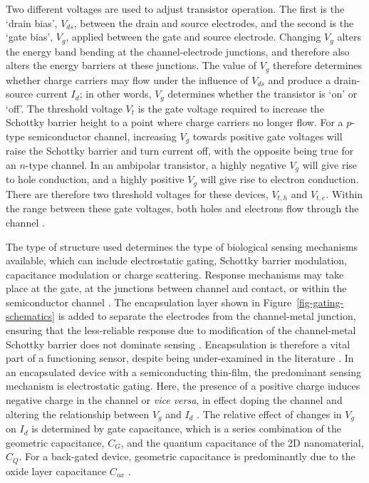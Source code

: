 \documentclass[
  a4paper,
]{scrbook}
\begin{document}
Two different voltages are used to adjust transistor operation. The
first is the `drain bias', \(V_{ds}\), between the drain and source
electrodes, and the second is the `gate bias', \(V_g\), applied between
the gate and source electrode. Changing \(V_g\) alters the energy band
bending at the channel-electrode junctions, and therefore also alters
the energy barriers at these junctions. The value of \(V_g\) therefore
determines whether charge carriers may flow under the influence of
\(V_{ds}\) and produce a drain-source current \(I_d\); in other words,
\(V_g\) determines whether the transistor is `on' or `off'. The
threshold voltage \(V_t\) is the gate voltage required to increase the
Schottky barrier height to a point where charge carriers no longer flow.
For a \(p\)-type semiconductor channel, increasing \(V_g\) towards
positive gate voltages will raise the Schottky barrier and turn current
off, with the opposite being true for an \(n\)-type channel. In an
ambipolar transistor, a highly negative \(V_g\) will give rise to hole
conduction, and a highly positive \(V_g\) will give rise to electron
conduction. There are therefore two threshold voltages for these
devices, \(V_{t,h}\) and \(V_{t,e}\). Within the range between these
gate voltages, both holes and electrons flow through the channel
\autocite{Avouris2007,Reiner-Rozman2015,Yao2021,Li2023}.

The type of structure used determines the type of biological sensing
mechanisms available, which can include electrostatic gating, Schottky
barrier modulation, capacitance modulation or charge scattering.
Response mechanisms may take place at the gate, at the junctions between
channel and contact, or within the semiconductor channel
\autocite{Heller2008,Li2023}. The encapsulation layer shown in
Figure~\ref{fig-gating-schematics} is added to separate the electrodes
from the channel-metal junction, ensuring that the less-reliable
response due to modification of the channel-metal Schottky barrier does
not dominate sensing \autocite{Heller2008,Yao2021}. Encapsulation is
therefore a vital part of a functioning sensor, despite being
under-examined in the literature \autocite{Shkodra2021}. In an
encapsulated device with a semiconducting thin-film, the predominant
sensing mechanism is electrostatic gating. Here, the presence of a
positive charge induces negative charge in the channel or \emph{vice
versa}, in effect doping the channel and altering the relationship
between \(V_g\) and \(I_d\) \autocite{Heller2008}. The relative effect
of changes in \(V_g\) on \(I_d\) is determined by gate capacitance,
which is a series combination of the geometric capacitance, \(C_{G}\),
and the quantum capacitance of the 2D nanomaterial, \(C_{Q}\). For a
back-gated device, geometric capacitance is predominantly due to the
oxide layer capacitance \(C_{ox}\) \autocite{Heller2009a,Li2023}.
\end{document}
